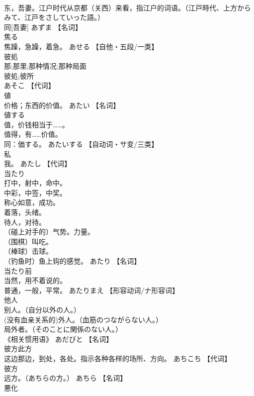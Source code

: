 \documentclass[8pt]{extreport}
\begin{document}
\begin{CJK}{UTF8}{min}
\\	东，吾妻。江户时代从京都（关西）来看，指江户的词语。（江戸時代、上方からみて、江戸をさしていった語。） 
\\	同[吾妻]	あずま		【名词】
\\	焦る	
\\	焦躁，急躁，着急。	あせる		【自他・五段/一类】
\\	彼処	
\\	那;那里;那种情况;那种局面 
\\	彼処;彼所 
\\	あそこ		【代词】
\\	値	
\\	价格；东西的价值。	あたい		【名词】
\\	値する	
\\	值，价钱相当于……。 
\\	值得，有……价值。 
\\	同：価する。	あたいする		【自动词・サ变/三类】
\\	私	
\\	我。	あたし		【代词】
\\	当たり	
\\	打中，射中，命中。 
\\	中彩，中签，中奖。 
\\	称心如意，成功。 
\\	着落，头绪。 
\\	待人，对待。 
\\	（碰上对手的）气势。力量。 
\\	（围棋）叫吃。 
\\	（棒球）击球。 
\\	（钓鱼时）鱼上钩的感觉。	あたり		【名词】
\\	当たり前	
\\	当然，用不着说的。 
\\	普通，一般，平常。	あたりまえ		【形容动词/ナ形容词】
\\	他人	
\\	别人。（自分以外の人。） 
\\	(没有血亲关系的)外人。（血筋のつながらない人。） 
\\	局外者。（そのことに関係のない人。） 
\\	《相关惯用语》	あだびと		【名词】
\\	彼方此方	
\\	这边那边，到处，各处。指示各种各样的场所、方向。	あちこち		【代词】
\\	彼方	
\\	远方。（あちらの方。）	あちら		【名词】
\\	悪化	

\end{CJK}
\end{document}
